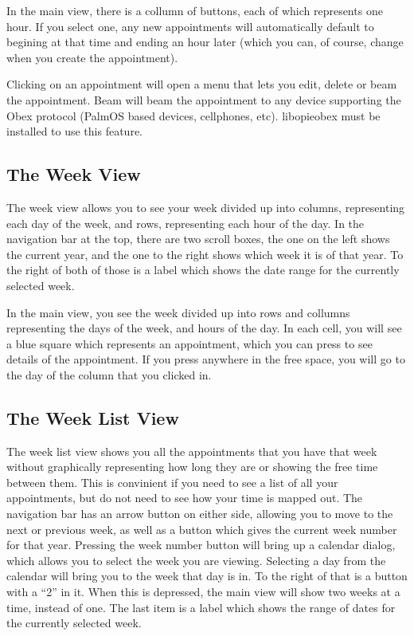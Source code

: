 \documentclass[12pt,letterpaper,oneside, openany]{book} \usepackage[latin1] {inputenc}
\begin{document}
In the main view, there is a collumn of buttons, each of which represents one hour. If you select one, any new appointments will automatically default to begining at that time and ending an hour later (which you can, of course, change when you create the appointment). 

Clicking on an appointment will open a menu that lets you edit, delete or beam the appointment. Beam will beam the appointment to any device supporting the Obex protocol (PalmOS based devices, cellphones, etc). libopieobex must be installed to use this feature. 

\subsection{The Week View}

The week view allows you to see your week divided up into columns, representing each day of the week, and rows, representing each hour of the day. In the navigation bar at the top, there are two scroll boxes, the one on the left shows the current year, and the one to the right shows which week it is of that year. To the right of both of those is a label which shows the date range for the currently selected week. 

In the main view, you see the week divided up into rows and collumns representing the days of the week, and hours of the day. In each cell, you will see a blue square which represents an appointment, which you can press to see details of the appointment. If you press anywhere in the free space, you will go to the day of the column that you clicked in. 

\subsection{The Week List View}

The week list view shows you all the appointments that you have that week without graphically representing how long they are or showing the free time between them. This is convinient if you need to see a list of all your appointments, but do not need to see how your time is mapped out. The navigation bar has an arrow button on either side, allowing you to move to the next or previous week, as well as a button which gives the current week number for that year. Pressing the week number button will bring up a calendar dialog, which allows you to select the week you are viewing. Selecting a day from the calendar will bring you to the week that day is in. To the right of that is a button with a ``2'' in it. When this is depressed, the main view will show two weeks at a time, instead of one. The last item is a label which shows the range of dates for the currently selected week. 
\end{document}
